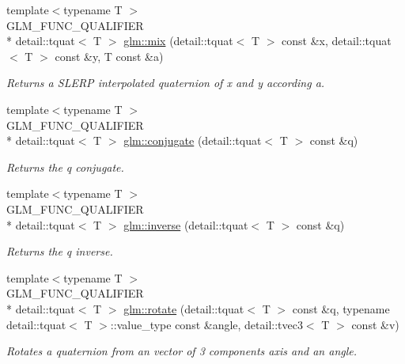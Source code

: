 \begin{DoxyCompactItemize}
\item 
{\footnotesize template$<$typename T $>$ }\\G\-L\-M\-\_\-\-F\-U\-N\-C\-\_\-\-Q\-U\-A\-L\-I\-F\-I\-E\-R \\*
detail\-::tquat$<$ T $>$ \hyperlink{group__gtc__quaternion_gaaea9592fd53952b636d680321edcdb31}{glm\-::mix} (detail\-::tquat$<$ T $>$ const \&x, detail\-::tquat$<$ T $>$ const \&y, T const \&a)
\begin{DoxyCompactList}\small\item\em Returns a S\-L\-E\-R\-P interpolated quaternion of x and y according a. \end{DoxyCompactList}\item 
{\footnotesize template$<$typename T $>$ }\\G\-L\-M\-\_\-\-F\-U\-N\-C\-\_\-\-Q\-U\-A\-L\-I\-F\-I\-E\-R \\*
detail\-::tquat$<$ T $>$ \hyperlink{group__gtc__quaternion_ga8b6594dffb8bf455d848ffa2169ba41d}{glm\-::conjugate} (detail\-::tquat$<$ T $>$ const \&q)
\begin{DoxyCompactList}\small\item\em Returns the q conjugate. \end{DoxyCompactList}\item 
{\footnotesize template$<$typename T $>$ }\\G\-L\-M\-\_\-\-F\-U\-N\-C\-\_\-\-Q\-U\-A\-L\-I\-F\-I\-E\-R \\*
detail\-::tquat$<$ T $>$ \hyperlink{group__gtc__quaternion_ga78b87a5e7152108e0dff0855d81b3bc1}{glm\-::inverse} (detail\-::tquat$<$ T $>$ const \&q)
\begin{DoxyCompactList}\small\item\em Returns the q inverse. \end{DoxyCompactList}\item 
{\footnotesize template$<$typename T $>$ }\\G\-L\-M\-\_\-\-F\-U\-N\-C\-\_\-\-Q\-U\-A\-L\-I\-F\-I\-E\-R \\*
detail\-::tquat$<$ T $>$ \hyperlink{group__gtc__quaternion_ga297d6a9635153c76d7c011efa716b5da}{glm\-::rotate} (detail\-::tquat$<$ T $>$ const \&q, typename detail\-::tquat$<$ T $>$\-::value\-\_\-type const \&angle, detail\-::tvec3$<$ T $>$ const \&v)
\begin{DoxyCompactList}\small\item\em Rotates a quaternion from an vector of 3 components axis and an angle. \end{DoxyCompactList}\item 

\end{DoxyCompactItemize}
